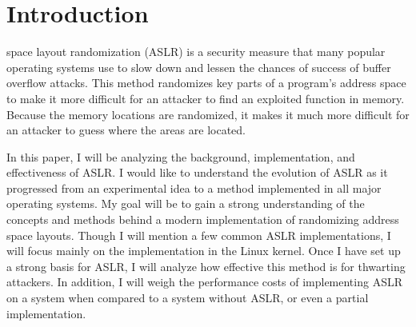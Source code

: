 \section{Introduction}
\label{s:intro} %

 space layout randomization (ASLR) is a security measure that many popular operating systems use to slow down and lessen the chances of success of buffer overflow attacks. This method randomizes key parts of a program’s address space to make it more difficult for an attacker to find an exploited function in memory. Because the memory locations are randomized, it makes it much more difficult for an attacker to guess where the areas are located.

In this paper, I will be analyzing the background, implementation, and effectiveness of ASLR. I would like to understand the evolution of ASLR as it progressed from an experimental idea to a method implemented in all major operating systems. My goal will be to gain a strong understanding of the concepts and methods behind a modern implementation of randomizing address space layouts. Though I will mention a few common ASLR implementations, I will focus mainly on the implementation in the Linux kernel. Once I have set up a strong basis for ASLR, I will analyze how effective this method is for thwarting attackers. In addition, I will weigh the performance costs of implementing ASLR on a system when compared to a system without ASLR, or even a partial implementation.

